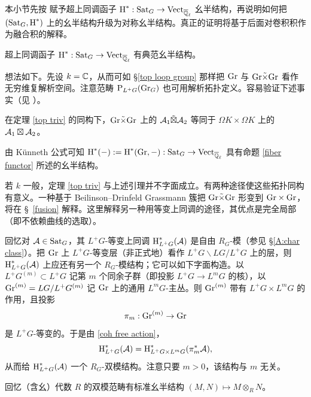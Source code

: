 本小节先按 \cite[\S\ 2.3]{Z14} 赋予超上同调函子 $\operatorname{H}^*: {\operatorname{Sat}}_G\to \operatorname{Vect}_{{\overline{{\mathbb Q}}_\ell}}$ 幺半结构，再说明如何把 $({\operatorname{Sat}}_G,\operatorname{H}^*)$ 上的幺半结构升级为对称幺半结构。真正的证明将基于后面对卷积积作为融合积的解释。

\begin{prop}\label{fiber functor}
超上同调函子 $\operatorname{H}^*:{\operatorname{Sat}}_G\to \operatorname{Vect}_{{\overline{{\mathbb Q}}_\ell}}$ 有典范幺半结构。
\end{prop}

想法如下。先设 $k={\mathbb C}$，从而可如 \S\ref{top loop group} 那样把 ${\operatorname{Gr}}$ 与 ${\operatorname{Gr}}\tilde\times{\operatorname{Gr}}$ 看作无穷维复解析空间。注意范畴 $\operatorname{P}_{L^+G}({\operatorname{Gr}}_G)$ 也可用解析拓扑定义。容易验证下述事实（见 \cite[Proposition 2.1.1]{Gi1}）。

\begin{lem}
在定理 \ref{top triv} 的同构下，${\operatorname{Gr}}\tilde\times{\operatorname{Gr}}$ 上的 ${\mathcal A}_1\tilde\boxtimes{\mathcal A}_2$ 等同于 $\Omega K\times\Omega K$ 上的 ${\mathcal A}_1\boxtimes{\mathcal A}_2$。
\end{lem}

由 K\"unneth 公式可知 $\operatorname{H}^*(-):=\operatorname{H}^*({\operatorname{Gr}},-):{\operatorname{Sat}}_G\to \operatorname{Vect}_{{\overline{{\mathbb Q}}_\ell}}$ 具有命题 \ref{fiber functor} 所述的幺半结构。

若 $k$ 一般，定理 \ref{top triv} 与上述引理并不字面成立。有两种途径使这些拓扑同构有意义。一种基于 Beilinson--Drinfeld Grassmann 簇把 ${\operatorname{Gr}}\tilde\times {\operatorname{Gr}}$ 形变到 ${\operatorname{Gr}}\times {\operatorname{Gr}}$，将在 \S\ \ref{fusion} 解释。这里解释另一种用等变上同调的途径，其优点是完全局部（即不依赖曲线的选取）。

回忆对 ${\mathcal A}\in{\operatorname{Sat}}_G$，其 $L^+G$-等变上同调 $\operatorname{H}^*_{L^+G}({\mathcal A})$ 是自由 $R_{G}$-模（参见 \S\ref{A:char class}）。把 ${\operatorname{Gr}}$ 上 $L^+G$-等变层（非正式地）看作 $L^+G\backslash LG/L^+G$ 上的层，则 $\operatorname{H}^*_{L^+G}({\mathcal A})$ 上应还有另一个 $R_{G}$-模结构；它可以如下字面构造。以 $L^+G^{(m)}\subset L^+G$ 记第 $m$ 个同余子群（即投影 $L^+G\to L^mG$ 的核），以 ${\operatorname{Gr}}^{(m)}=LG/L^+G^{(m)}$ 记 ${\operatorname{Gr}}$ 上的通用 $L^m G$-主丛。则 ${\operatorname{Gr}}^{(m)}$ 带有 $L^+G\times L^mG$ 的作用，且投影
\[\pi_m:{\operatorname{Gr}}^{(m)}\to {\operatorname{Gr}}\]
是 $L^+G$-等变的。于是由 \eqref{coh free action}，
\[\operatorname{H}^*_{L^+G}({\mathcal A})= \operatorname{H}^*_{L^+G\times L^mG}(\pi_m^*{\mathcal A}),\]
从而给 $\operatorname{H}^*_{L^+G}({\mathcal A})$ 一个 $R_{G}$-双模结构。注意只要 $m>0$，该结构与 $m$ 无关。

回忆（含幺）代数 $R$ 的双模范畴有标准幺半结构 $(M,N)\mapsto M\otimes_RN$。

